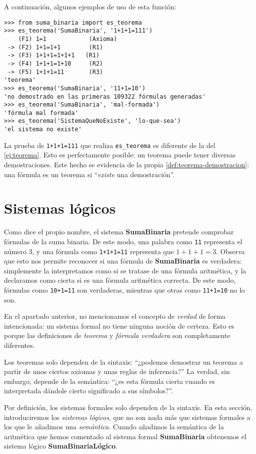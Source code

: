 A continuación, algunos ejemplos de uso de esta función:
\begin{lstlisting}[numbers=none,frame=none]
>>> from suma_binaria import es_teorema
>>> es_teorema('SumaBinaria', '1+1+1=111')
    (F1) 1=1            (Axioma)
 -> (F2) 1+1=1+1        (R1)
 -> (F3) 1+1+1=1+1+1   (R1)
 -> (F4) 1+1+1=1+10     (R2)
 -> (F5) 1+1+1=11       (R3)
'teorema'
>>> es_teorema('SumaBinaria', '11+1=10')
'no demostrado en las primeras 109322 fórmulas generadas'
>>> es_teorema('SumaBinaria', 'mal-formada')
'fórmula mal formada'
>>> es_teorema('SistemaQueNoExiste', 'lo-que-sea')
'el sistema no existe'
\end{lstlisting}
La prueba de \texttt{1+1+1=111} que realiza \texttt{es\_teorema} es diferente de la del \cref{ej:teorema}. Esto es perfectamente posible: un teorema puede tener diversas demostraciones. Este hecho se evidencia de la propia \cref{def:teorema-demostracion}: una fórmula es un teorema si ``\textit{existe} una demostración''.
\section{Sistemas lógicos}\label{sec:sistemas-logicos}

Como dice el propio nombre, el sistema \textbf{SumaBinaria} pretende comprobar fórmulas de la suma binaria. De este modo, una palabra como \texttt{11} representa el número $3$, y una fórmula como \texttt{1+1+1=11} representa que $1+1+1=3$. Observa que esto nos permite reconocer si una fórmula de \textbf{SumaBinaria} es verdadera: simplemente la interpretamos como si se tratase de una fórmula aritmética, y la declaramos como cierta si es una fórmula aritmética correcta. De este modo, fórmulas como \texttt{10+1=11} son verdaderas, mientras que otras como \texttt{11+1=10} no lo son.

En el apartado anterior, no mencionamos el concepto de \emph{verdad} de forma intencionada: un sistema formal no tiene ninguna noción de certeza. Esto es porque las definiciones de \emph{teorema} y \emph{fórmula verdadera} son completamente diferentes.

Los teoremas solo dependen de la sintaxis: ``¿podemos demostrar un teorema a partir de unos ciertos axiomas y unas reglas de inferencia?'' La verdad, sin embargo, depende de la semántica: ``¿es esta fórmula cierta cuando es interpretada dándole cierto significado a sus símbolos?''.

Por definición, los sistemas formales solo dependen de la sintaxis. En esta sección, introduciremos los \emph{sistemas lógicos}, que no son nada más que sistemas formales a los que le añadimos una \emph{semántica}. Cuando añadimos la semántica de la aritmética que hemos comentado al sistema formal \textbf{SumaBinaria} obtenemos el sistema lógico \textbf{SumaBinariaLógico}.

